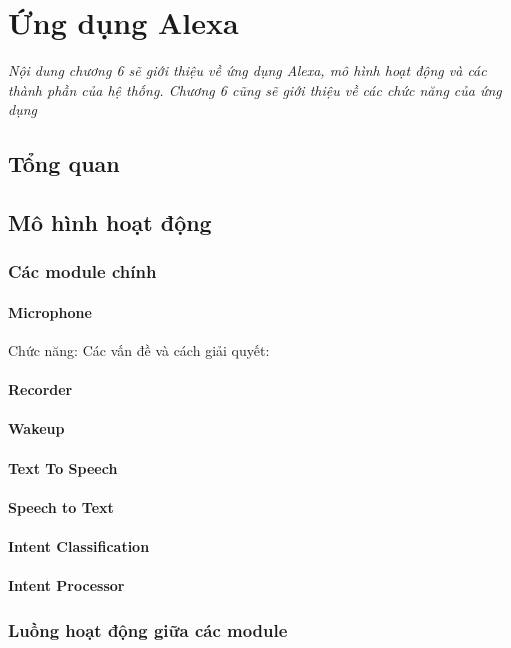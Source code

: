\chapter{Ứng dụng Alexa}
\ifpdf
    \graphicspath{{Chapter6/Chapter6Figs/PNG/}{Chapter6/Chapter6Figs/PDF/}{Chapter6/Chapter6Figs/}}
\else
    \graphicspath{{Chapter6/Chapter6Figs/EPS/}{Chapter6/Chapter6Figs/}}
\fi

\textit{Nội dung chương 6 sẽ giới thiệu về ứng dụng Alexa, mô hình hoạt động và các thành phần của hệ thống. Chương 6 cũng sẽ giới thiệu về các chức năng của ứng dụng}

\section{Tổng quan}
\section{Mô hình hoạt động}
\subsection{Các module chính}
\subsubsection{Microphone}
Chức năng:
Các vấn đề và cách giải quyết:
\subsubsection{Recorder}
\subsubsection{Wakeup}
\subsubsection{Text To Speech}
\subsubsection{Speech to Text}
\subsubsection{Intent Classification}
\subsubsection{Intent Processor}
\subsection{Luồng hoạt động giữa các module}

